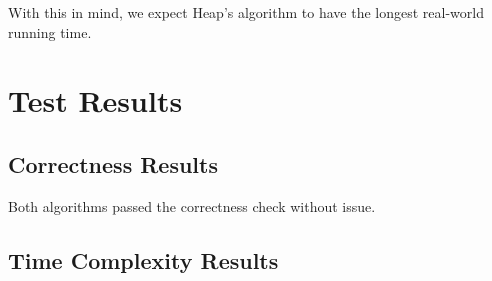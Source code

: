 \documentclass[10pt, oneside]{article}   	%
\begin{document}
With this in mind, we expect Heap's algorithm to have the longest real-world running time.

\section{Test Results}

\subsection{Correctness Results}

Both algorithms passed the correctness check without issue.

\subsection{Time Complexity Results}
\end{document}
